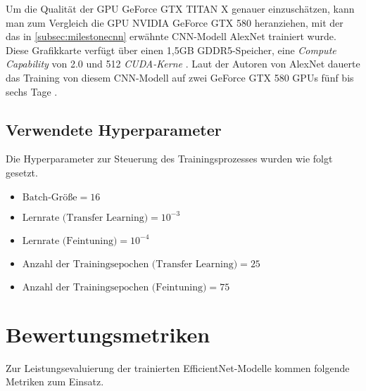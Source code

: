 Um die Qualität der GPU GeForce GTX TITAN X genauer einzuschätzen, kann man zum Vergleich die GPU NVIDIA GeForce GTX 580 heranziehen, mit der das in \autoref{subsec:milestonecnn} erwähnte CNN-Modell AlexNet trainiert wurde. Diese Grafikkarte verfügt über einen 1,5GB GDDR5-Speicher, eine \emph{Compute Capability} von 2.0 und 512 \emph{CUDA-Kerne} \cite{gtx580}. Laut der Autoren von AlexNet dauerte das Training von diesem CNN-Modell auf zwei GeForce GTX 580 GPUs fünf bis sechs Tage \cite[7]{10.1145/3065386}.

\subsection{Verwendete Hyperparameter}

Die Hyperparameter zur Steuerung des Trainingsprozesses wurden wie folgt gesetzt.

\begin{itemize}
	\item $\text{Batch-Größe} = 16$
	\item $\text{Lernrate (Transfer Learning)} = 10^{-3}$
	\item $\text{Lernrate (Feintuning)} = 10^{-4}$
	\item $\text{Anzahl der Trainingsepochen (Transfer Learning)} = 25$
	\item $\text{Anzahl der Trainingsepochen (Feintuning)} = 75$
\end{itemize}

\section{Bewertungsmetriken} \label{sec:evalmetrics}

Zur Leistungsevaluierung der trainierten EfficientNet-Modelle kommen folgende Metriken zum Einsatz.

